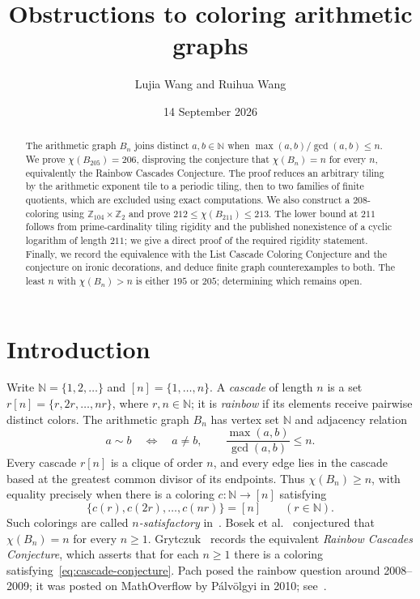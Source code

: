 \documentclass[11pt,reqno]{amsart}
\title[Obstructions to coloring arithmetic graphs]{Obstructions to coloring arithmetic graphs}
\author{Lujia Wang and Ruihua Wang}
\date{14 September 2026}
\newcommand{\N}{\mathbb N}
\newcommand{\Z}{\mathbb Z}
\theoremstyle{definition}
\theoremstyle{remark}
\numberwithin{equation}{section}
\begin{document}
\begin{abstract}
The arithmetic graph $B_n$ joins distinct $a,b\in\N$ when
$\max(a,b)/\gcd(a,b)\le n$. We prove $\chi(B_{205})=206$, disproving
the conjecture that $\chi(B_n)=n$ for every $n$, equivalently the
Rainbow Cascades Conjecture. The proof reduces an arbitrary tiling by
the arithmetic exponent tile to a periodic tiling, then to two families
of finite quotients, which are excluded using exact computations.
We also construct a $208$-coloring using $\Z_{104}\times\Z_2$ and prove
$212\le\chi(B_{211})\le213$. The lower bound at $211$ follows from
prime-cardinality tiling rigidity and the published nonexistence of a
cyclic logarithm of length $211$; we give a direct proof of the required
rigidity statement. Finally, we record the equivalence with the List
Cascade Coloring Conjecture and the conjecture on ironic decorations,
and deduce finite graph counterexamples to both. The least $n$ with
$\chi(B_n)>n$ is either $195$ or $205$; determining which remains open.
\end{abstract}
\maketitle
\section{Introduction}
Write $\N=\{1,2,\ldots\}$ and $[n]=\{1,\ldots,n\}$. A \emph{cascade}
of length $n$ is a set $r[n]=\{r,2r,\ldots,nr\}$, where $r,n\in\N$;
it is \emph{rainbow} if its elements receive pairwise distinct colors.
The arithmetic graph $B_n$ has vertex set $\N$ and adjacency relation
\[
 a\sim b\quad\Longleftrightarrow\quad
 a\ne b,\qquad \frac{\max(a,b)}{\gcd(a,b)}\le n.
\]
Every cascade $r[n]$ is a clique of order $n$, and every edge lies in the
cascade based at the greatest common divisor of its endpoints.
Thus $\chi(B_n)\ge n$, with equality precisely when there is a coloring
$c:\N\to[n]$ satisfying
\begin{equation}\label{eq:cascade-conjecture}
 \{c(r),c(2r),\ldots,c(nr)\}=[n]\qquad(r\in\N).
\end{equation}
Such colorings are called \emph{$n$-satisfactory} in~\cite{CCP}.
Bosek et al.~\cite{Bosek} conjectured that $\chi(B_n)=n$ for every $n\ge1$.
Grytczuk~\cite{Gryt} records the equivalent
\emph{Rainbow Cascades Conjecture}, which asserts that for each $n\ge1$
there is a coloring satisfying~\eqref{eq:cascade-conjecture}.
Pach posed the rainbow question around 2008--2009; it was posted on
MathOverflow by P\'alv\"olgyi in 2010; see~\cite{CCP,Gryt}.
\end{document}
